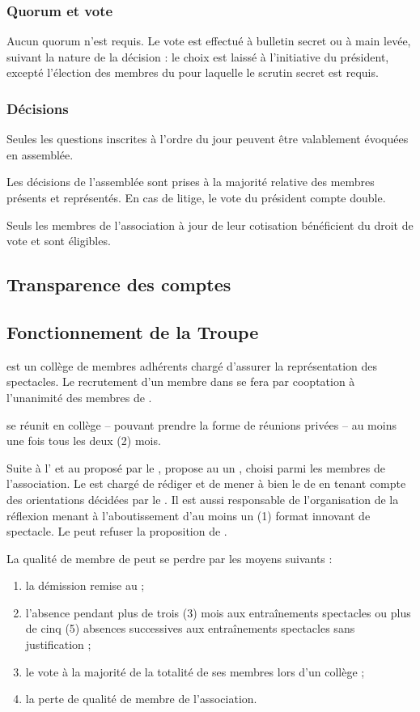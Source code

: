 \documentclass[a4paper,french,10pt]{article}
\newcommand{\article}[1]{\subsection{#1}\addtocounter{article}{1}}
\newcounter{article}
\begin{document}
\subsubsection*{Quorum et vote}

Aucun quorum n'est requis. Le vote est effectué à bulletin secret ou à
main levée, suivant la nature de la décision : le choix est laissé à
l'initiative du président, excepté l'élection des membres du \bureau{}
pour laquelle le scrutin secret est requis.


\subsubsection*{Décisions}

Seules les questions inscrites à l’ordre du jour peuvent être
valablement évoquées en assemblée.

Les décisions de l’assemblée sont prises à la majorité relative des
membres présents et représentés. En cas de litige, le vote du
président compte double.

Seuls les membres de l’association à jour de leur cotisation
bénéficient du droit de vote et sont éligibles.

\article{Transparence des comptes}
\label{sec:transp-des-compt}

\article{Fonctionnement de la Troupe}
\label{sec:fonctionnement-troupe}
\troupe{} est un collège de membres adhérents chargé d'assurer la représentation des spectacles. Le recrutement d'un membre dans \troupe{} se fera par cooptation à l'unanimité des membres de \troupe{}.

 \troupe{} se réunit en collège -- pouvant prendre la forme de réunions privées -- au moins une fois tous les deux (2) mois.

Suite à l'\AGO{} et au \PA{} proposé par le \bureau{}, \troupe{} propose au \bureau{} un \DA{}, choisi parmi les membres de l'association. Le \DA{} est chargé de rédiger et de mener à bien le \PA{} de \troupe{} en tenant compte des orientations décidées par le \bureau{}. Il est aussi responsable de l'organisation de la réflexion menant à l'aboutissement d'au moins un (1) format innovant de spectacle. Le \bureau{} peut refuser la proposition de \troupe{}. 

La qualité de membre de \troupe{} peut se perdre par les moyens suivants :

\begin{enumerate}
	\item la démission remise au \DA{} ;
	\item l'absence pendant plus de trois  (3) mois aux entraînements spectacles ou plus de cinq (5) absences successives aux entraînements spectacles sans justification ;
	\item le vote à la majorité de la totalité de ses membres lors d'un collège ;
	\item la perte de qualité de membre de l'association.

\end{enumerate}
\end{document}
